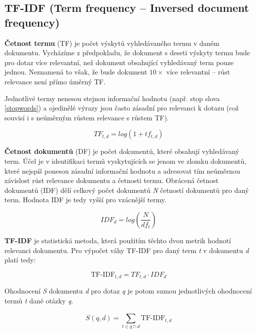 \subsection{TF-IDF (Term frequency -- Inversed document frequency)}
\label{tf-idf}

\textbf{Četnost termu} (TF) je počet výskytů vyhledávaného termu v daném dokumentu. Vycházíme z předpokladu, že dokument s deseti výskyty termu bude pro dotaz více relevantní, než dokument obsahující vyhledávaný term pouze jednou. Neznamená to však, že bude dokument $10\times$ více relevantní -- růst relevance není přímo úměrný TF.\par
Jednotlivé termy nenesou stejnou informační hodnotu (např. stop slova \ref{stopwords}) a ojedinělé výrazy jsou často zásadní pro relevanci k dotazu (což souvisí i s neúměrným růstem relevance s růstem TF).\par

$$
    TF_{t,d} = log(1+tf_{t,d})
$$

\textbf{Četnost dokumentů} (DF) je počet dokumentů, které obsahují vyhledávaný term. Účel je v identifikaci termů vyskytujících se jenom ve zlomku dokumentů, které nejspíš ponesou zásadní informační hodnotu a adresovat tím neúměrnou závislost růst relevance dokumentu a četnosti termu. Obrácená četnost dokumentů (IDF) dělí celkový počet dokumentů \emph{N} četností dokumentů pro daný term. Hodnota IDF je tedy vyšší pro vzácnější termy.\par

$$
    IDF_{d} = log(\frac{N}{df_t})
$$

\textbf{TF-IDF} je statistická metoda, která použitím těchto dvou metrik hodnotí relevanci dokumentu.
Pro výpočet váhy TF-IDF pro daný term \emph{t} v dokumentu \emph{d} platí tedy:

$$
    \text{TF-IDF}_{t,d} = TF_{t,d} \cdot IDF_d
$$

Ohodnocení \emph{S} dokumentu \emph{d} pro dotaz \emph{q} je potom sumou jednotlivých ohodnocení termů \emph{t} dané otázky \emph{q}.

$$
    S(q,d) = \sum_{t\in{q \cap d}}^{}\text{TF-IDF}_{t,d}
$$

